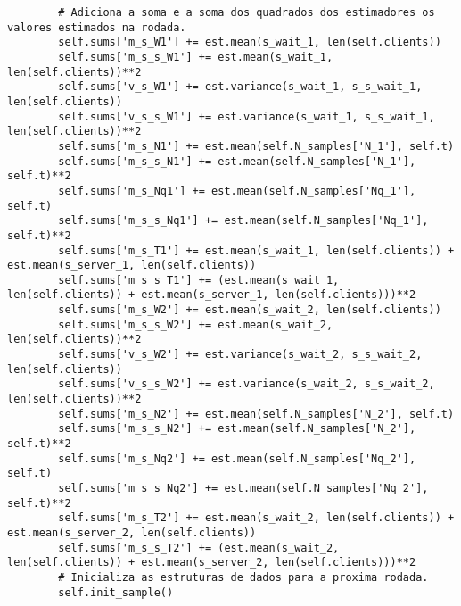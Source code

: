 \begin{lstlisting}
        # Adiciona a soma e a soma dos quadrados dos estimadores os valores estimados na rodada.
        self.sums['m_s_W1'] += est.mean(s_wait_1, len(self.clients))
        self.sums['m_s_s_W1'] += est.mean(s_wait_1, len(self.clients))**2
        self.sums['v_s_W1'] += est.variance(s_wait_1, s_s_wait_1, len(self.clients))
        self.sums['v_s_s_W1'] += est.variance(s_wait_1, s_s_wait_1, len(self.clients))**2
        self.sums['m_s_N1'] += est.mean(self.N_samples['N_1'], self.t)
        self.sums['m_s_s_N1'] += est.mean(self.N_samples['N_1'], self.t)**2
        self.sums['m_s_Nq1'] += est.mean(self.N_samples['Nq_1'], self.t)
        self.sums['m_s_s_Nq1'] += est.mean(self.N_samples['Nq_1'], self.t)**2
        self.sums['m_s_T1'] += est.mean(s_wait_1, len(self.clients)) + est.mean(s_server_1, len(self.clients))
        self.sums['m_s_s_T1'] += (est.mean(s_wait_1, len(self.clients)) + est.mean(s_server_1, len(self.clients)))**2
        self.sums['m_s_W2'] += est.mean(s_wait_2, len(self.clients))
        self.sums['m_s_s_W2'] += est.mean(s_wait_2, len(self.clients))**2
        self.sums['v_s_W2'] += est.variance(s_wait_2, s_s_wait_2, len(self.clients))
        self.sums['v_s_s_W2'] += est.variance(s_wait_2, s_s_wait_2, len(self.clients))**2
        self.sums['m_s_N2'] += est.mean(self.N_samples['N_2'], self.t)
        self.sums['m_s_s_N2'] += est.mean(self.N_samples['N_2'], self.t)**2
        self.sums['m_s_Nq2'] += est.mean(self.N_samples['Nq_2'], self.t)
        self.sums['m_s_s_Nq2'] += est.mean(self.N_samples['Nq_2'], self.t)**2
        self.sums['m_s_T2'] += est.mean(s_wait_2, len(self.clients)) + est.mean(s_server_2, len(self.clients))
        self.sums['m_s_s_T2'] += (est.mean(s_wait_2, len(self.clients)) + est.mean(s_server_2, len(self.clients)))**2
        # Inicializa as estruturas de dados para a proxima rodada.
        self.init_sample()
    

\end{lstlisting}
